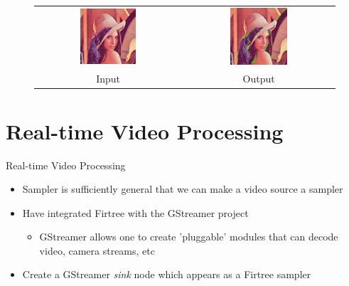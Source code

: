 \documentclass{beamer}
\newcommand{\bi}{\begin{itemize}}
\newcommand{\ei}{\end{itemize}}
\begin{document}
\begin{frame}
\begin{figure}\centering
\begin{tabular}{cc}
\includegraphics[width=0.4\textwidth]{examples/reduce/lena} &
\includegraphics[width=0.4\textwidth]{examples/reduce/output_example7} \\
Input & Output
\end{tabular}
\end{figure}
\end{frame}


\section{Real-time Video Processing} %

\begin{frame}{Real-time Video Processing}
  \bi
    \item Sampler is sufficiently general that we can make a video source a
    sampler
    \item Have integrated Firtree with the GStreamer project
    \bi
      \item GStreamer allows one to create 'pluggable' modules that can decode
      video, camera streams, etc
    \ei
    \item Create a GStreamer \emph{sink} node which appears as a Firtree
    sampler
  \ei
\end{frame}
\end{document}
